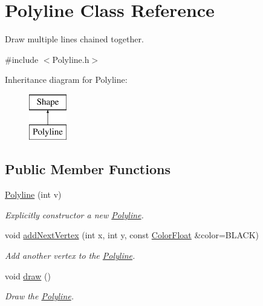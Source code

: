 \hypertarget{class_polyline}{\section{Polyline Class Reference}
\label{class_polyline}
}


Draw multiple lines chained together.  




{\ttfamily \#include $<$Polyline.\+h$>$}

Inheritance diagram for Polyline\+:\begin{figure}[H]
\begin{center}
\leavevmode
\includegraphics[height=2.000000cm]{class_polyline}
\end{center}
\end{figure}
\subsection*{Public Member Functions}
\begin{DoxyCompactItemize}
\item 
\hyperlink{class_polyline_a01c3f4e90326a346cd5f70c95d107cb9}{Polyline} (int v)
\begin{DoxyCompactList}\small\item\em Explicitly constructor a new \hyperlink{class_polyline}{Polyline}. \end{DoxyCompactList}\item 
void \hyperlink{class_polyline_ac025e62a56822d0f2747e8b08614ee85}{add\+Next\+Vertex} (int x, int y, const \hyperlink{struct_color_float}{Color\+Float} \&color=B\+L\+A\+C\+K)
\begin{DoxyCompactList}\small\item\em Add another vertex to the \hyperlink{class_polyline}{Polyline}. \end{DoxyCompactList}\item 
void \hyperlink{class_polyline_a21ea8147cb2a0d8d9b61af7b62520395}{draw} ()
\begin{DoxyCompactList}\small\item\em Draw the \hyperlink{class_polyline}{Polyline}. \end{DoxyCompactList}\end{DoxyCompactItemize}
